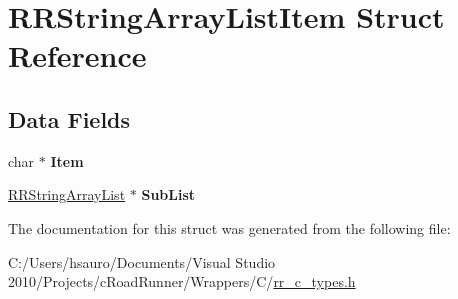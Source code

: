 \hypertarget{struct_r_r_string_array_list_item}{
\section{\-R\-R\-String\-Array\-List\-Item \-Struct \-Reference}
\label{struct_r_r_string_array_list_item}
}
\subsection*{\-Data \-Fields}
\begin{DoxyCompactItemize}
\item 
\hypertarget{struct_r_r_string_array_list_item_a244b3f4d5a24f0cae10de599fe62c889}{
char $\ast$ {\bfseries \-Item}}
\label{struct_r_r_string_array_list_item_a244b3f4d5a24f0cae10de599fe62c889}

\item 
\hypertarget{struct_r_r_string_array_list_item_a933c5818b994da50f225a40b967fb661}{
\hyperlink{struct_r_r_string_array_list}{\-R\-R\-String\-Array\-List} $\ast$ {\bfseries \-Sub\-List}}
\label{struct_r_r_string_array_list_item_a933c5818b994da50f225a40b967fb661}

\end{DoxyCompactItemize}


\-The documentation for this struct was generated from the following file\-:\begin{DoxyCompactItemize}
\item 
\-C\-:/\-Users/hsauro/\-Documents/\-Visual Studio 2010/\-Projects/c\-Road\-Runner/\-Wrappers/\-C/\hyperlink{rr__c__types_8h}{rr\-\_\-c\-\_\-types.\-h}\end{DoxyCompactItemize}
